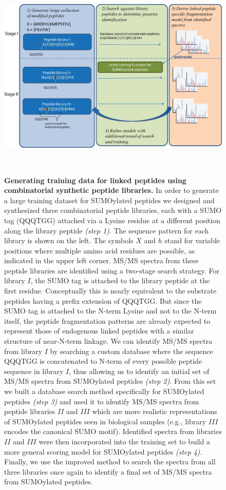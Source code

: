 \documentclass[arial,11pt]{article}
\begin{document}
\begin{figure}[h!]
	\centering
		\includegraphics[height=100mm, width=150mm]{figures/Sumo_library_construction}
		\caption{{\bf Generating training data for linked peptides using combinatorial synthetic peptide libraries.} {\footnotesize In order to generate a large training dataset for SUMOylated peptides we designed and synthesized three combinatorial peptide libraries, each with a SUMO tag (QQQTGG) attached via a Lysine residue at a different position along the library peptide {\em (step 1)}. The sequence pattern for each library is shown on the left.  The symbols $X$ and $h$ stand for variable positions where multiple amino acid residues are possible, as indicated in the upper left corner.  MS/MS spectra from these peptide libraries are identified using a two-stage search strategy.  For library $I$, the SUMO tag is attached to the library peptide at the first residue.  Conceptually this is nearly equivalent to the substrate peptides having a prefix extension of QQQTGG. But since the SUMO tag is attached to the N-term Lysine and not to the N-term itself, the peptide fragmentation patterns are already expected to represent those of endogenous linked peptides with a similar structure of near-N-term linkage. We can identify MS/MS spectra from library $I$ by searching a custom database where the sequence QQQTGG is concatenated to N-term of every possible peptide sequence in library $I$, thus allowing us to identify an initial set of MS/MS spectra from SUMOylated peptides {\em (step 2)}. From this set we built a database search method specifically for SUMOylated peptides {\em (step 3)} and used it to identify MS/MS spectra from peptide libraries $II$ and $III$ which are more realistic representations of SUMOylated peptides seen in biological samples (e.g., library $III$ encodes the canonical SUMO motif). Identified spectra from libraries $II$ and $III$ were then incorporated into the training set to build a more general scoring model for SUMOylated peptides {\em (step 4)}. Finally, we use the improved method to search the spectra from all three libraries once again to identify a final set of MS/MS spectra from SUMOylated peptides.}}
\label{librarybuild}
\end{figure}
\end{document}
